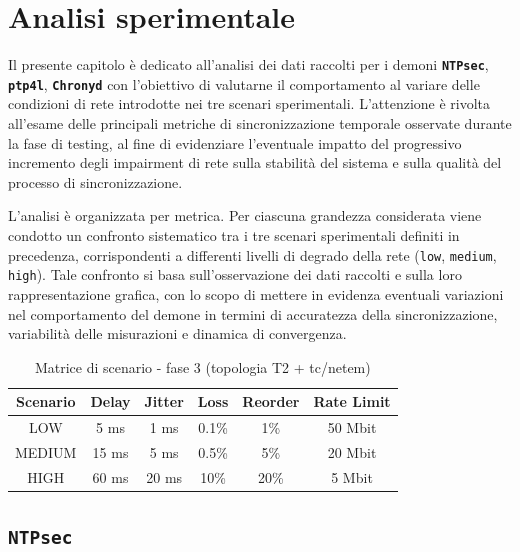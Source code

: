 \chapter{Analisi sperimentale}
\label{cha:NTPsec} \label{cha:NTPsec}

Il presente capitolo è dedicato all’analisi dei dati raccolti per i demoni
\texttt{\textbf{NTPsec}}, \texttt{\textbf{ptp4l}}, \texttt{\textbf{Chronyd}} con l’obiettivo
di valutarne il comportamento al variare delle condizioni di rete introdotte nei tre
scenari sperimentali. L’attenzione è rivolta all’esame delle principali metriche
di sincronizzazione temporale osservate durante la fase di testing, al fine di evidenziare
l’eventuale impatto del progressivo incremento degli impairment di rete sulla stabilità
del sistema e sulla qualità del processo di sincronizzazione.

L’analisi è organizzata per metrica. Per ciascuna grandezza considerata viene
condotto un confronto sistematico tra i tre scenari sperimentali definiti in
precedenza, corrispondenti a differenti livelli di degrado della rete (\texttt{low},
\texttt{medium}, \texttt{high}). Tale confronto si basa sull’osservazione dei dati
raccolti e sulla loro rappresentazione grafica, con lo scopo di mettere in
evidenza eventuali variazioni nel comportamento del demone in termini di
accuratezza della sincronizzazione, variabilità delle misurazioni e dinamica di convergenza.

\begin{table}[H]
  \centering
  \caption{Matrice di scenario - fase 3 (topologia T2 + tc/netem)}
  \begin{tabular}{|c|c|c|c|c|c|}
    \hline
    \textbf{Scenario} & \textbf{Delay} & \textbf{Jitter} & \textbf{Loss} & \textbf{Reorder} & \textbf{Rate Limit} \\
    \hline
    LOW               & 5 ms           & 1 ms            & 0.1\%         & 1\%              & 50 Mbit             \\
    \hline
    MEDIUM            & 15 ms          & 5 ms            & 0.5\%         & 5\%              & 20 Mbit             \\
    \hline
    HIGH              & 60 ms          & 20 ms           & 10\%          & 20\%             & 5 Mbit              \\
    \hline
  \end{tabular}
  \label{tab:scenario_matrix}
\end{table}
\section{\texttt{NTPsec}}

